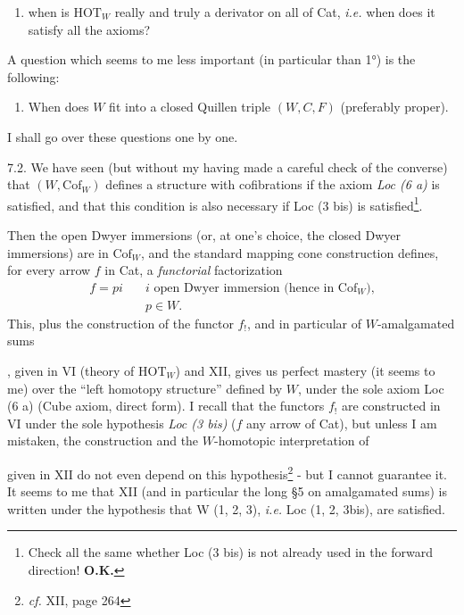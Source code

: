 
\begin{enumerate}[label=4)]
\item when is $\mathrm{HOT}_W$ really and truly a derivator on all of Cat, \textit{i.e.} when does it satisfy all the axioms?
\end{enumerate}

A question which seems to me less important (in particular than 1°) is the following:

\begin{enumerate}[label=1 bis)]
\item When does $W$ fit into a closed Quillen triple $(W,C,F)$ (preferably proper).
\end{enumerate}

I shall go over these questions one by one.

7.2. We have seen (but without my having made a careful check of the converse) that $(W,\mathrm{Cof}_W)$ defines a structure with cofibrations if the axiom \textit{Loc (6 a)} is satisfied, and that this condition is also necessary if Loc (3 bis) is satisfied\footnote[45]{Check all the same whether Loc (3 bis) is not already used in the forward direction! \textbf{O.K.}}.

Then the open Dwyer immersions (or, at one's choice, the closed Dwyer immersions) are in $\mathrm{Cof}_W$, and the standard mapping cone construction defines, for every arrow $f$ in Cat, a \textit{functorial} factorization
\[
\begin{aligned}
f = pi \quad & i \text{ open Dwyer immersion (hence in } \mathrm{Cof}_W\text{),}\\
& p \in W.
\end{aligned}
\]
This, plus the construction of the functor $f_!$, and in particular of $W$-amalgamated sums
, given in VI (theory of $\mathrm{HOT}_W$) and XII, gives us perfect mastery (it seems to me) over the ``left homotopy structure'' defined by $W$, under the sole axiom Loc (6 a) (Cube axiom, direct form). I recall that the functors $f_!$ are constructed in VI under the sole hypothesis \textit{Loc (3 bis)} ($f$ any arrow of Cat), but unless I am mistaken, the construction
and the $W$-homotopic interpretation of
given in XII do not even depend on this hypothesis\footnote[46]{\textit{cf.} XII, page 264} - but I cannot guarantee it. It seems to me that XII (and in particular the long §5 on amalgamated sums) is written under the hypothesis that W (1, 2, 3), \textit{i.e.} Loc (1, 2, 3bis), are satisfied.

